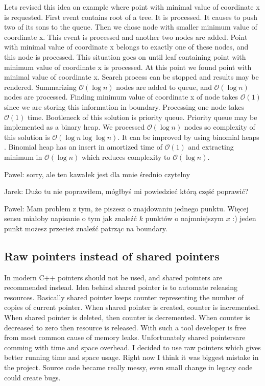 \documentclass[10pt,a4paper]{article}
\newcommand{\pawel}[1]{\noindent\colorbox{myRed}{Pawel: #1}}
\newcommand{\jarek}[1]{\noindent\colorbox{myYellow}{Jarek: #1}}
\newcommand{\Oh}{\mathcal{O}}
\begin{document}
Lets revised this idea on example where point with minimal value of coordinate x is requested. First event contains root of a tree. It is processed. It causes to push two of its sons to the queue. Then we chose node with smaller minimum value of coordinate x. This event is processed and another two nodes are added. Point with minimal value of coordinate x belongs to exactly one of these nodes, and this node is processed. This situation goes on until leaf containing point with minimum value of coordinate x is processed. At this point we found point with minimal value of coordinate x. Search process can be stopped and results may be rendered. Summarizing $\Oh(\log n)$ nodes are added to queue, and $\Oh(\log n)$ nodes are processed. Finding minimum value of coordinate x of node takes $\Oh(1)$ since we are storing this information in boundary. Processing one node takes $\Oh(1)$ time. Bootleneck of this solution is priority queue. Priority queue may be implemented as a binary heap. We processed $\Oh(\log n)$ nodes so complexity of this solution is $\Oh(\log n \log \log n)$. It can be improved by using binomial heaps \cite{BINOMHEAPS}. Binomial heap has an insert in amortized time of $\Oh(1)$ and extracting minimum in $\Oh(\log n)$ which reduces complexity to $\Oh(\log n)$.

\pawel{sorry, ale ten kawałek jest dla mnie średnio czytelny}

\jarek{Dużo tu nie poprawiłem, mógłbyś mi powiedzieć którą część poprawić?}

\pawel{Mam problem z tym, że piszesz o znajdowaniu jednego punktu. Więcej sensu miałoby napisanie o tym jak znaleźć $k$ punktów o najmniejszym $x$ :) jeden punkt możesz przecież znaleźć patrząc na boundary. }

\subsection{Raw pointers instead of shared pointers}

In modern C++ pointers should not be used, and shared pointers are recommended instead. Idea behind shared pointer is to automate releasing resources. Basically shared pointer keeps counter representing the number of copies of current pointer. When shared pointer is created, counter is incremented. When shared pointer is deleted, then counter is decremented. When counter is decreased to zero then resource is released. With such a tool developer is free from most common cause of memory leaks. Unfortunately shared pointersare comming with time and space overhead. I decided to use raw pointers which gives better running time and space usage.
Right now I think it was biggest mistake in the project. Source code became really messy, even small change in legacy code could create bugs.
\end{document}
